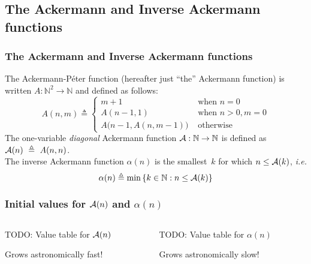 \subsection*{The Ackermann and Inverse Ackermann functions}
\begin{frame}
\frametitle{The Ackermann and Inverse Ackermann functions}
\label{defn: ack}
	The Ackermann-P\'eter function (hereafter just
	``the'' Ackermann function) is
	written $A : \mathbb{N}^2 \to \mathbb{N}$ and defined as follows:
	\begin{equation}
	\label{eq:ackermann}
	A(n, m) \triangleq \begin{cases}
	m + 1 & \text{ when } n = 0 \\
	A(n-1, 1) & \text{ when } n > 0, m = 0 \\
	A\big(n-1, A(n, m-1)\big) & \text{ otherwise}
	\end{cases}
	\end{equation}
	The one-variable \emph{diagonal} Ackermann function $\mathcal{A} : \mathbb{N} \to \mathbb{N}$ is defined as $\mathcal{A}(n)~\triangleq~A(n, n)$.\\[5pt]
	
	The inverse Ackermann function $\alpha(n)$ is the smallest~$k$ for
	which $n \le \mathcal{A}(k)$, \emph{i.e.}
	\begin{equation*}
	\alpha(n) \triangleq \min\left\{k\in \mathbb{N} : n \le \mathcal{A}(k)\right\}
	\end{equation*}
\end{frame}


\begin{frame}
\frametitle{Initial values for $\mathcal{A}(n)$ and $\alpha(n)$}
\begin{columns}[T]
	\begin{column}{0.5\textwidth}
		TODO: Value table for $\mathcal{A}(n)$
		
		Grows astronomically fast!
	\end{column}

  \begin{column}{0.5\textwidth}
  	TODO: Value table for $\alpha(n)$
  	
  	Grows astronomically slow!
  \end{column}
\end{columns}
\end{frame}


